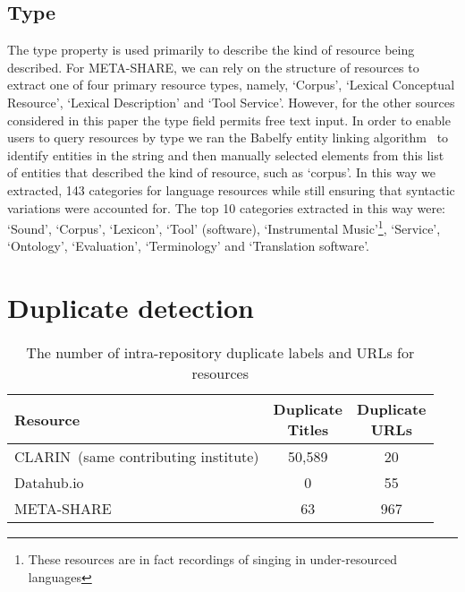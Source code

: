 \documentclass[11pt]{article}
\begin{document}
\subsection{Type}

The type property is used primarily to describe the kind of resource being
described. For META-SHARE, we can rely on the structure of resources to extract
one of four primary resource types, namely, `Corpus', `Lexical Conceptual
Resource', `Lexical Description' and `Tool Service'. However, for the other
sources considered in this paper the type field permits free text input. In order 
to enable users to query resources by type we ran the Babelfy entity linking
algorithm~\cite{Moroetal:14tacl} to identify entities in the string and
then manually selected elements from this list of entities that described the kind of
resource, such as `corpus'. In this way we extracted, 143 categories for
language resources while still ensuring that syntactic variations were accounted
for. The top 10 categories extracted in this way were: `Sound', `Corpus',
`Lexicon', `Tool' (software), `Instrumental Music'\footnote{These
resources are in fact recordings of singing in under-resourced languages}, `Service', `Ontology', `Evaluation',
`Terminology' and `Translation software'.

\section{Duplicate detection}

\label{duplicates}

\begin{table}
    \begin{center}
    \begin{tabular}{l|cc}
        Resource   & \thead{Duplicate \\ Titles} & \thead{Duplicate \\ URLs} \\
        \hline                                                            
        CLARIN{\tiny~(same contributing institute)}     & 50,589           & 20          \\   
        Datahub.io & 0                & 55             \\
        META-SHARE & 63               & 967            \\
    \end{tabular}
    \end{center}
    \caption{\label{tab:self-dupes}The number of intra-repository duplicate labels and URLs for
    resources}
\end{table}
\end{document}
